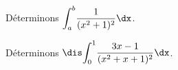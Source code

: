 \documentclass[a4paper,10pt]{report}
\newcommand{\Int}[2]{\ensuremath{\mathchoice%
	{{\displaystyle\int_{#1}^{#2}}}
	{{\displaystyle\int_{#1}^{#2}}}
	{\int_{#1}^{#2}}
	{\int_{#1}^{#2}}
	}}
\begin{document}
\begin{ex} Déterminons $\Int{a}{b} \dfrac{1}{(x^2+1)^2} \dx$.
%

\vspace{7cm}

\end{ex}
\begin{ex} Déterminons $\dis \Int{0}{1} \dfrac{3x-1}{(x^2+x+1)^2} \dx$.
%

\vspace{10cm}
\end{ex}

\end{document}
